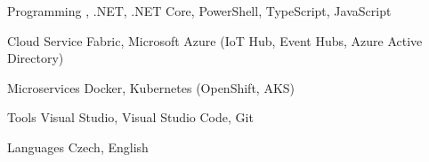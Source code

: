 

\begin{cvskills}

  \cvskill
    {Programming} %
    {\Csharp, .NET, .NET Core, PowerShell, TypeScript, JavaScript} %

  \cvskill
    {Cloud} %
    {Service Fabric, Microsoft Azure (IoT Hub, Event Hubs, Azure Active Directory)} %

  \cvskill
    {Microservices} %
    {Docker, Kubernetes (OpenShift, AKS)} %

  \cvskill
    {Tools} %
    {Visual Studio, Visual Studio Code, Git} %

  \cvskill
    {Languages} %
    {Czech, English} %

\end{cvskills}
